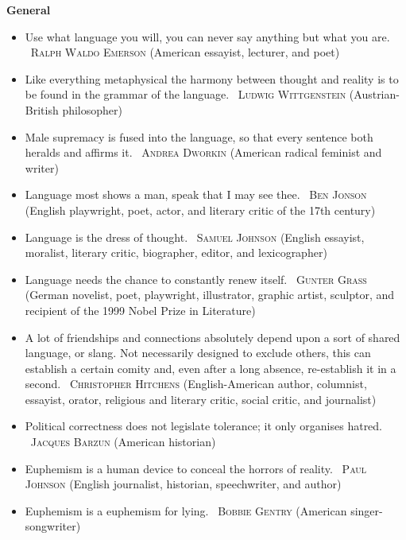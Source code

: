 \documentclass[a4paper]{article}
\newcommand{\heading}[1]{\textbf{#1}}
\newcommand{\linguist}[1]{\textemdash~\textsc{#1}}
\begin{document}
\begin{center}
  \Large \bfseries \scshape {} \normalsize \normalfont {}
\end{center}
\begin{multicols}{2}
  \heading{General}
  \begin{itemize}
    \item Use what language you will, you can never say anything but what you are. \linguist{Ralph Waldo Emerson} (American essayist, lecturer, and poet)
    \item Like everything metaphysical the harmony between thought and reality is to be found in the grammar of the language. \linguist{Ludwig Wittgenstein} (Austrian-British philosopher)
    \item Male supremacy is fused into the language, so that every sentence both heralds and affirms it. \linguist{Andrea Dworkin} (American radical feminist and writer)
    \item Language most shows a man, speak that I may see thee. \linguist{Ben Jonson} (English playwright, poet, actor, and literary critic of the 17th century)
    \item Language is the dress of thought. \linguist{Samuel Johnson} (English essayist, moralist, literary critic, biographer, editor, and lexicographer)
    \item Language needs the chance to constantly renew itself. \linguist{Gunter Grass} (German novelist, poet, playwright, illustrator, graphic artist, sculptor, and recipient of the 1999 Nobel Prize in Literature)
    \item A lot of friendships and connections absolutely depend upon a sort of shared language, or slang. Not necessarily designed to exclude others, this can establish a certain comity and, even after a long absence, re-establish it in a second. \linguist{Christopher Hitchens} (English-American author, columnist, essayist, orator, religious and literary critic, social critic, and journalist)
    \item Political correctness does not legislate tolerance; it only organises hatred. \linguist{Jacques Barzun} (American historian)
    \item Euphemism is a human device to conceal the horrors of reality. \linguist{Paul Johnson} (English journalist, historian, speechwriter, and author)
    \item Euphemism is a euphemism for lying. \linguist{Bobbie Gentry} (American singer-songwriter)

\end{itemize}
\end{multicols}
\end{document}
